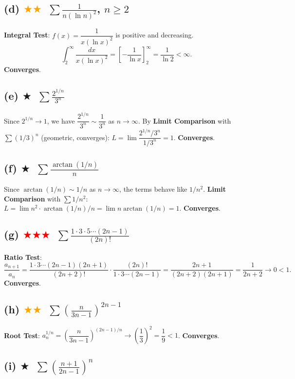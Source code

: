 \documentclass[12pt,a4paper]{article}
\newcommand{\easy}{\textcolor{green!60!black}{$\bigstar$}}
\newcommand{\medium}{\textcolor{orange}{$\bigstar\bigstar$}}
\newcommand{\hard}{\textcolor{red}{$\bigstar\bigstar\bigstar$}}
\begin{document}
\subsection*{(d) \medium\ $\displaystyle\sum\frac{1}{n(\ln n)^2}$, $n\geq 2$}

\textbf{Integral Test}: $f(x)=\dfrac{1}{x(\ln x)^2}$ is positive and decreasing.
\[
  \int_2^{\infty}\frac{dx}{x(\ln x)^2}
  = \left[-\frac{1}{\ln x}\right]_2^{\infty} = \frac{1}{\ln 2} < \infty.
\]
\textbf{Converges}.

\subsection*{(e) \easy\ $\displaystyle\sum\frac{2^{1/n}}{3^n}$}

Since $2^{1/n}\to 1$, we have $\dfrac{2^{1/n}}{3^n}\sim\dfrac{1}{3^n}$ as $n\to\infty$.  By \textbf{Limit Comparison} with $\sum(1/3)^n$ (geometric, converges): $L = \lim \dfrac{2^{1/n}/3^n}{1/3^n} = 1$.  \textbf{Converges}.

\subsection*{(f) \easy\ $\displaystyle\sum\frac{\arctan(1/n)}{n}$}

Since $\arctan(1/n)\sim 1/n$ as $n\to\infty$, the terms behave like $1/n^2$.  \textbf{Limit Comparison} with $\sum 1/n^2$: $L=\lim n^2\cdot\arctan(1/n)/n = \lim n\arctan(1/n)=1$.  \textbf{Converges}.

\subsection*{(g) \hard\ $\displaystyle\sum\frac{1\cdot3\cdot5\cdots(2n-1)}{(2n)!}$}

\textbf{Ratio Test}:
\[
  \frac{a_{n+1}}{a_n}
  = \frac{1\cdot3\cdots(2n-1)(2n+1)}{(2n+2)!}\cdot\frac{(2n)!}{1\cdot3\cdots(2n-1)}
  = \frac{2n+1}{(2n+2)(2n+1)} = \frac{1}{2n+2}\to 0 < 1.
\]
\textbf{Converges}.

\subsection*{(h) \medium\ $\displaystyle\sum\left(\frac{n}{3n-1}\right)^{2n-1}$}

\textbf{Root Test}: $a_n^{1/n} = \left(\dfrac{n}{3n-1}\right)^{(2n-1)/n} \to \left(\dfrac{1}{3}\right)^2 = \dfrac{1}{9} < 1$. \textbf{Converges}.

\subsection*{(i) \easy\ $\displaystyle\sum\left(\frac{n+1}{2n-1}\right)^n$}
\end{document}
